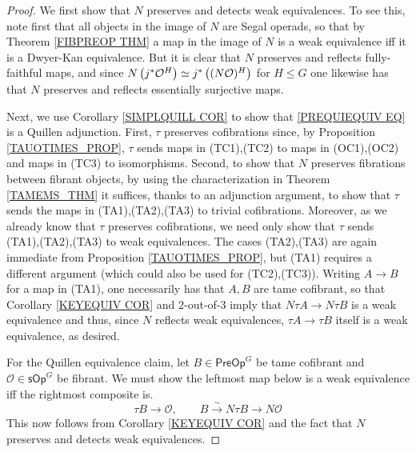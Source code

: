 \documentclass[a4paper,10pt]{article}%
\numberwithin{equation}{section}
\numberwithin{figure}{section}
\theoremstyle{definition} %
\renewcommand{\O}{\ensuremath{\mathcal O}}
\newcommand{\1}{\ensuremath{\mathbbm 1}}%
\begin{document}
\begin{proof}
	We first show that $N$ preserves and detects weak equivalences.
	To see this, note first that all objects in the image of $N$ are Segal operads, so that by Theorem \ref{FIBPREOP THM} 
	a map in the image of $N$ is a weak equivalence iff it is a Dwyer-Kan equivalence.
	But it is clear that $N$ preserves and reflects fully-faithful maps,
	and since
	$N \left(j^{\**} \O^H \right)
	\simeq
	j^{\**} \left( (N \O)^H \right)$
	for $H\leq G$
	one likewise has that 
	$N$ preserves and reflects essentially surjective maps.
	
	Next, we use Corollary \ref{SIMPLQUILL COR}
	to show that \eqref{PREQUIEQUIV EQ}
	is a Quillen adjunction.
	First,
	$\tau$ preserves cofibrations since,
	by Proposition \ref{TAUOTIMES_PROP},
	$\tau$ sends maps in (TC1),(TC2) to maps in (OC1),(OC2)
	and maps in (TC3) to isomorphisms.
	Second, to show that $N$ preserves fibrations between fibrant objects,
	by using the characterization in Theorem \ref{TAMEMS_THM}
	it suffices, thanks to an adjunction argument,
	to show that $\tau$
	sends the maps in (TA1),(TA2),(TA3)
	to trivial cofibrations. 
	Moreover, as we already know that $\tau$ preserves cofibrations, we need only show 	that $\tau$
	sends (TA1),(TA2),(TA3)
	to weak equivalences.
	The cases (TA2),(TA3) are again immediate 
	from Proposition \ref{TAUOTIMES_PROP},
	but (TA1) requires a different argument
	(which could also be used for (TC2),(TC3)).
	Writing $A \to B$ for a map in (TA1), one necessarily has that $A,B$ are tame cofibrant, so that
	Corollary \ref{KEYEQUIV COR}
	and $2$-out-of-$3$ imply that 
	$N \tau A \to N \tau B$ is a weak equivalence
	and thus, since $N$ reflects weak equivalences,
	$\tau A \to \tau B$ itself is a weak equivalence,
	as desired.
	
	For the Quillen equivalence claim, 
	let $B \in \mathsf{PreOp}^G$ be tame cofibrant and
	$\mathcal{O} \in \mathsf{sOp}^G$ be fibrant.
	We must show the leftmost map below is a weak equivalence iff 
	the rightmost composite is.
	\[
	\tau B \to \mathcal{O},
	\qquad
	B \xrightarrow{\sim} N \tau B \to N \mathcal{O}
	\]
	This now follows from Corollary \ref{KEYEQUIV COR}
	and the fact that $N$ preserves and detects weak equivalences.
\end{proof}
\end{document}

